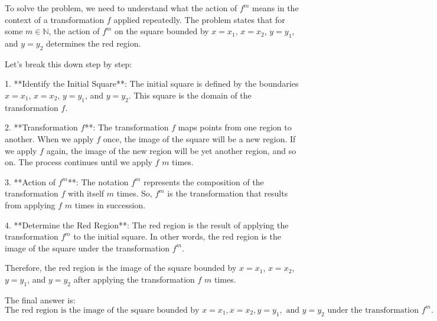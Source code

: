 To solve the problem, we need to understand what the action of \( f^m \) means in the context of a transformation \( f \) applied repeatedly. The problem states that for some \( m \in \mathbb{N} \), the action of \( f^m \) on the square bounded by \( x = x_1 \), \( x = x_2 \), \( y = y_1 \), and \( y = y_2 \) determines the red region.

Let's break this down step by step:

1. **Identify the Initial Square**: The initial square is defined by the boundaries \( x = x_1 \), \( x = x_2 \), \( y = y_1 \), and \( y = y_2 \). This square is the domain of the transformation \( f \).

2. **Transformation \( f \)**: The transformation \( f \) maps points from one region to another. When we apply \( f \) once, the image of the square will be a new region. If we apply \( f \) again, the image of the new region will be yet another region, and so on. The process continues until we apply \( f \) \( m \) times.

3. **Action of \( f^m \)**: The notation \( f^m \) represents the composition of the transformation \( f \) with itself \( m \) times. So, \( f^m \) is the transformation that results from applying \( f \) \( m \) times in succession.

4. **Determine the Red Region**: The red region is the result of applying the transformation \( f^m \) to the initial square. In other words, the red region is the image of the square under the transformation \( f^m \).

Therefore, the red region is the image of the square bounded by \( x = x_1 \), \( x = x_2 \), \( y = y_1 \), and \( y = y_2 \) after applying the transformation \( f \) \( m \) times.

The final answer is:
\[
\boxed{\text{The red region is the image of the square bounded by } x = x_1, x = x_2, y = y_1, \text{ and } y = y_2 \text{ under the transformation } f^m.}
\]